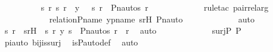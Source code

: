 \begin{isabellebody}
\ \ \ \ \ \ \ \ \isamarkupfalse%
\ {\isachardoublequoteopen}{\isasymexists}s\ r{\isachardot}{\kern0pt}\ {\isacharless}{\kern0pt}s{\isacharcomma}{\kern0pt}\ r{\isachargreater}{\kern0pt}\ {\isasymin}\ y\ {\isasymand}\ \ {\isacharless}{\kern0pt}s{\isacharprime}{\kern0pt}{\isacharcomma}{\kern0pt}\ r{\isacharprime}{\kern0pt}{\isachargreater}{\kern0pt}\ {\isacharequal}{\kern0pt}\ {\isacharless}{\kern0pt}Pn{\isacharunderscore}{\kern0pt}auto{\isacharparenleft}{\kern0pt}{\isasympi}{\isacharparenright}{\kern0pt}{\isacharbackquote}{\kern0pt}s{\isacharcomma}{\kern0pt}\ {\isasympi}{\isacharbackquote}{\kern0pt}r{\isachargreater}{\kern0pt}{\isachardoublequoteclose}\ \isanewline
\ \ \ \ \ \ \ \ \ \ \isamarkupfalse%
\ {\isacharparenleft}{\kern0pt}rule{\isacharunderscore}{\kern0pt}tac\ pair{\isacharunderscore}{\kern0pt}rel{\isacharunderscore}{\kern0pt}arg{\isacharparenright}{\kern0pt}\ \isanewline
\ \ \ \ \ \ \ \ \ \ \isamarkupfalse%
\ relation{\isacharunderscore}{\kern0pt}P{\isacharunderscore}{\kern0pt}name\ ypname\ s{\isacharprime}{\kern0pt}r{\isacharprime}{\kern0pt}H\ Pn{\isacharunderscore}{\kern0pt}auto\ \isanewline
\ \ \ \ \ \ \ \ \ \ \isamarkupfalse%
\ auto\isanewline
\ \ \ \ \ \ \ \ \isamarkupfalse%
\ \isamarkupfalse%
\ s\ r\ \ srH\ {\isacharcolon}{\kern0pt}\ {\isachardoublequoteopen}{\isacharless}{\kern0pt}s{\isacharcomma}{\kern0pt}\ r{\isachargreater}{\kern0pt}{\isasymin}\ y{\isachardoublequoteclose}\ {\isachardoublequoteopen}s{\isacharprime}{\kern0pt}\ {\isacharequal}{\kern0pt}\ Pn{\isacharunderscore}{\kern0pt}auto{\isacharparenleft}{\kern0pt}{\isasympi}{\isacharparenright}{\kern0pt}{\isacharbackquote}{\kern0pt}s{\isachardoublequoteclose}\ {\isachardoublequoteopen}r{\isacharprime}{\kern0pt}\ {\isacharequal}{\kern0pt}\ {\isasympi}{\isacharbackquote}{\kern0pt}r{\isachardoublequoteclose}\ \isamarkupfalse%
\ auto\ \isanewline
\isanewline
\ \ \ \ \ \ \ \ \isamarkupfalse%
\ {\isachardoublequoteopen}{\isasympi}\ {\isasymin}\ surj{\isacharparenleft}{\kern0pt}P{\isacharcomma}{\kern0pt}\ P{\isacharparenright}{\kern0pt}{\isachardoublequoteclose}\ \isanewline
\ \ \ \ \ \ \ \ \ \ \isamarkupfalse%
\ piauto\ bij{\isacharunderscore}{\kern0pt}is{\isacharunderscore}{\kern0pt}surj\ \isamarkupfalse%
\ is{\isacharunderscore}{\kern0pt}P{\isacharunderscore}{\kern0pt}auto{\isacharunderscore}{\kern0pt}def\ \isamarkupfalse%
\ auto\ \isanewline
\ \ \ \ \ \ \ \ \isamarkupfalse%

\end{isabellebody}
